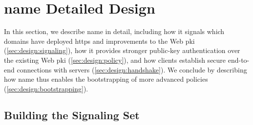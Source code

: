 


\section{\ac{name} Detailed Design}
In this section, we describe \ac{name} in detail, including how it signals which domains have
deployed \ac{https} and improvements to the Web \ac{pki}
(\autoref{sec:design:signaling}), how it provides stronger public-key
authentication over the existing Web \ac{pki} (\autoref{sec:design:policy}), and
how clients establish secure end-to-end connections with servers
(\autoref{sec:design:handshake}). We conclude by describing how \ac{name} thus
enables the bootstrapping of more advanced policies
(\autoref{sec:design:bootstrapping}).
\subsection{Building the Signaling Set}
\label{sec:design:signaling}

